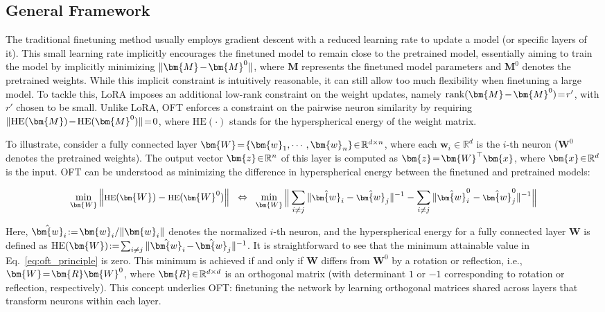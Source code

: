 \subsection{General Framework}

The traditional finetuning method usually employs gradient descent with a reduced learning rate to update a model (or specific layers of it). This small learning rate implicitly encourages the finetuned model to remain close to the pretrained model, essentially aiming to train the model by implicitly minimizing $\thickmuskip=2mu \medmuskip=2mu \| \bm{M} - \bm{M}^0\|$, where $\bm{M}$ represents the finetuned model parameters and $\bm{M}^0$ denotes the pretrained weights. While this implicit constraint is intuitively reasonable, it can still allow too much flexibility when finetuning a large model. To tackle this, LoRA imposes an additional low-rank constraint on the weight updates, namely $\thickmuskip=2mu \medmuskip=2mu \text{rank}(\bm{M} - \bm{M}^0)=r'$, with $r'$ chosen to be small. Unlike LoRA, OFT enforces a constraint on the pairwise neuron similarity by requiring $\thickmuskip=2mu \medmuskip=2mu \| \text{HE}(\bm{M})-\text{HE}(\bm{M}^0) \|=0$, where $\text{HE}(\cdot)$ stands for the hyperspherical energy of the weight matrix. 

To illustrate, consider a fully connected layer $\thickmuskip=2mu \medmuskip=2mu \bm{W}=\{\bm{w}_1,\cdots,\bm{w}_n\}\in\mathbb{R}^{d\times n}$, where each $\bm{w}_i\in\mathbb{R}^d$ is the $i$-th neuron ($\bm{W}^0$ denotes the pretrained weights). The output vector $\thickmuskip=2mu \medmuskip=2mu \bm{z}\in\mathbb{R}^n$ of this layer is computed as $\thickmuskip=2mu \medmuskip=2mu \bm{z}=\bm{W}^\top \bm{x}$, where $\thickmuskip=2mu \medmuskip=2mu \bm{x} \in \mathbb{R}^d$ is the input. OFT can be understood as minimizing the difference in hyperspherical energy between the finetuned and pretrained models:

\begin{equation}\label{eq:oft_principle}
\footnotesize
\min_{\bm{W}} \left\| \text{HE}(\bm{W})-\text{HE}(\bm{W}^0)\right\|~~\Leftrightarrow~~\min_{\bm{W}} \bigg{\|} \sum_{i\neq j} \|\hat{\bm{w}}_i-\hat{\bm{w}}_j\|^{-1}-\sum_{i\neq j} \|\hat{\bm{w}}^0_i-\hat{\bm{w}}^0_j\|^{-1}\bigg{\|}
\end{equation}

Here, $\thickmuskip=2mu \medmuskip=2mu \hat{\bm{w}}_i := \bm{w}_i/\|\bm{w}_i\|$ denotes the normalized $i$-th neuron, and the hyperspherical energy for a fully connected layer $\bm{W}$ is defined as $\thickmuskip=2mu \medmuskip=2mu \text{HE}(\bm{W}):= \sum_{i\neq j} \|\hat{\bm{w}}_i-\hat{\bm{w}}_j\|^{-1}$. It is straightforward to see that the minimum attainable value in Eq.~\eqref{eq:oft_principle} is zero. This minimum is achieved if and only if $\bm{W}$ differs from $\bm{W}^0$ by a rotation or reflection, i.e., $\thickmuskip=2mu \medmuskip=2mu \bm{W} = \bm{R}\bm{W}^0$, where $\thickmuskip=2mu \medmuskip=2mu \bm{R}\in\mathbb{R}^{d \times d}$ is an orthogonal matrix (with determinant $1$ or $-1$ corresponding to rotation or reflection, respectively). This concept underlies OFT: finetuning the network by learning orthogonal matrices shared across layers that transform neurons within each layer.

